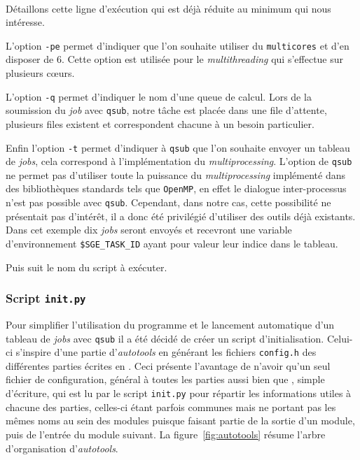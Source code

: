 \

Détaillons cette ligne d'exécution qui est déjà réduite au minimum qui nous intéresse.

L'option \texttt{-pe} permet d'indiquer que l'on souhaite utiliser du \texttt{multicores} et d'en disposer de 6. Cette option est utilisée pour le \emph{multithreading} qui s'effectue sur plusieurs c\oe{}urs.

L'option \texttt{-q} permet d'indiquer le nom d'une queue de calcul. Lors de la soumission du \emph{job} avec \texttt{qsub}, notre tâche est placée dans une file d'attente, plusieurs files existent et correspondent chacune à un besoin particulier.

Enfin l'option \texttt{-t} permet d'indiquer à \texttt{qsub} que l'on souhaite envoyer un tableau de \emph{jobs}, cela correspond à l'implémentation du \emph{multiprocessing}. L'option de \texttt{qsub} ne permet pas d'utiliser toute la puissance du \emph{multiprocessing} implémenté dans des bibliothèques standards tels que \texttt{OpenMP}, en effet le dialogue inter-processus n'est pas possible avec \texttt{qsub}. Cependant, dans notre cas, cette possibilité ne présentait pas d'intérêt, il a donc été privilégié d'utiliser des outils déjà existants. Dans cet exemple dix \emph{jobs} seront envoyés et recevront une variable d'environnement \texttt{\$SGE\_TASK\_ID} ayant pour valeur leur indice dans le tableau.

Puis suit le nom du script à exécuter.

		\subsubsection{Script \texttt{init.py}}

Pour simplifier l'utilisation du programme et le lancement automatique d'un tableau de \emph{jobs} avec \texttt{qsub} il a été décidé de créer un script d'initialisation. Celui-ci s'inspire d'une partie d'\emph{autotools} en générant les fichiers \texttt{config.h} des différentes parties écrites en \Cpp{} \cite{AUTOTOOLS}. Ceci présente l'avantage de n'avoir qu'un seul fichier de configuration, général à toutes les parties aussi bien \Python{} que \Cpp{}, simple d'écriture, qui est lu par le script \texttt{init.py} pour répartir les informations utiles à chacune des parties, celles-ci étant parfois communes mais ne portant pas les mêmes noms au sein des modules puisque faisant partie de la sortie d'un module, puis de l'entrée du module suivant. La figure~\ref{fig:autotools} résume l'arbre d'organisation d'\emph{autotools}.

